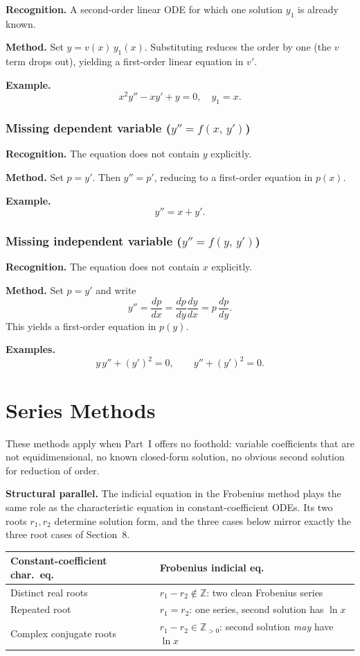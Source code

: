 \documentclass{essay}
\begin{document}
\textbf{Recognition.}  A second-order linear ODE for which one solution $y_1$ is already known.

\textbf{Method.}  Set $y = v(x)\,y_1(x)$.  Substituting reduces the order by one (the $v$ term drops out), yielding a first-order linear equation in $v'$.

\textbf{Example.}
\[
  x^2 y'' - xy' + y = 0, \quad y_1 = x.
\]

\section{Missing dependent variable ($y'' = f(x,\, y')$)}

\textbf{Recognition.}  The equation does not contain $y$ explicitly.

\textbf{Method.}  Set $p = y'$.  Then $y'' = p'$, reducing to a first-order equation in $p(x)$.

\textbf{Example.}
\[
  y'' = x + y'.
\]

\section{Missing independent variable ($y'' = f(y,\, y')$)}

\textbf{Recognition.}  The equation does not contain $x$ explicitly.

\textbf{Method.}  Set $p = y'$ and write
\[
  y'' = \frac{dp}{dx} = \frac{dp}{dy}\frac{dy}{dx} = p\,\frac{dp}{dy}.
\]
This yields a first-order equation in $p(y)$.

\textbf{Examples.}
\[
  y\,y'' + (y')^2 = 0, \qquad y'' + (y')^2 = 0.
\]

\part{Series Methods}

These methods apply when Part~I offers no foothold: variable coefficients that are not equidimensional, no known closed-form solution, no obvious second solution for reduction of order.

\medskip
\noindent\textbf{Structural parallel.}  The indicial equation in the Frobenius method plays the same role as the characteristic equation in constant-coefficient ODEs.  Its two roots $r_1, r_2$ determine solution form, and the three cases below mirror exactly the three root cases of Section~8.

\begin{center}
  \renewcommand{\arraystretch}{1.4}
  \begin{tabular}{ll}
    \toprule
    \textbf{Constant-coefficient char.\ eq.} & \textbf{Frobenius indicial eq.} \\
    \midrule
    Distinct real roots & $r_1 - r_2 \notin \mathbb{Z}$: two clean Frobenius series \\
    Repeated root & $r_1 = r_2$: one series, second solution has $\ln x$ \\
    Complex conjugate roots & $r_1 - r_2 \in \mathbb{Z}_{>0}$: second solution \emph{may} have $\ln x$ \\
    \bottomrule
  \end{tabular}
\end{center}
\end{document}

